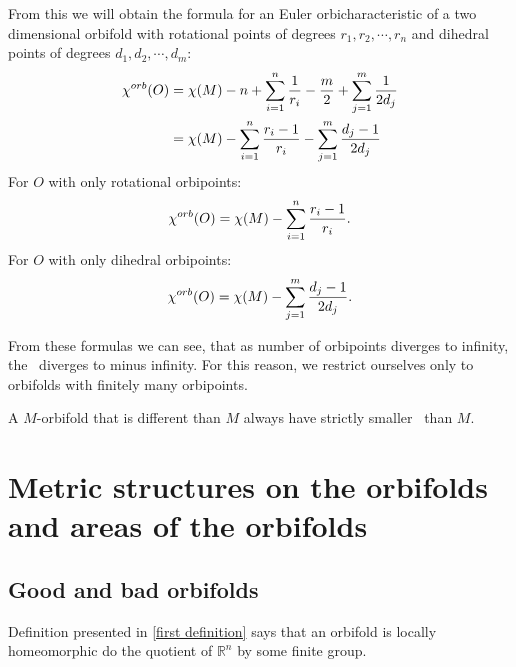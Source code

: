 From this we will obtain the formula for an Euler orbicharacteristic of a two dimensional 
orbifold with rotational points of degrees $r_1, r_2, \cdots, r_n$ and dihedral points 
of degrees $d_1, d_2, \cdots, d_m$:
\begin{align}\label{chi orb expression}
{\chi^{orb}(O)} &= \chi (M) - n + \sum_{i=1}^n \frac{1}{r_i} - \frac{m}{2} + \sum_{j=1}^m \frac{1}{2d_j} \\
&= \chi (M) - \sum_{i=1}^n \frac{r_i-1}{r_i} - \sum_{j=1}^m \frac{d_j-1}{2d_j}
\end{align}
For $O$ with only rotational orbipoints:
\begin{equation}\label{chi orb expression rotational}
{\chi^{orb}(O)} = \chi (M) - \sum_{i=1}^n \frac{r_i-1}{r_i}.
\end{equation}
For $O$ with only dihedral orbipoints:
\begin{equation}\label{chi orb expression dihedral}
{\chi^{orb}(O)} = \chi (M) - \sum_{j=1}^m \frac{d_j-1}{2d_j}.
\end{equation}

From these formulas we can see, that as number of orbipoints diverges to infinity, the \Eoc\ 
diverges to minus infinity. For this reason, we restrict ourselves only to orbifolds 
with finitely many orbipoints.
\begin{observation}\label{orbifolds have smaller Eoc than their base manifolds}
A $M$-orbifold that is different than $M$ always have strictly smaller \Eoc\ than $M$. 
\end{observation}


\section{Metric structures on the orbifolds and areas of the orbifolds}

\subsection{Good and bad orbifolds}
Definition presented in \ref{first definition} 
says that an orbifold is locally homeomorphic do the quotient of $\mathbb{R}^n$ 
by some finite group. 

